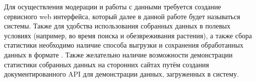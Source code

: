 \tab
Для осуществления модерации и работы с данными требуется создание сервисного web интерфейса, который далее в данной работе будет называться  системы.
Также для удобства использования собранных данных в полевых условиях (например, во время поиска и обезвреживания растения), а также сбора статистики необходимо наличие способа выгрузки и сохранения обработанных данных в формате .
Также желательно наличие возможности демонстрации статистики собранных данных на сторонних сайтах путём создания документированного API для демонстрации данных, загруженных в систему.
